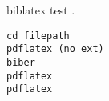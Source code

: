 \documentclass{article}
\begin{document}
biblatex test \parencite{something}.

\begin{verbatim}
cd filepath
pdflatex (no ext)
biber
pdflatex
pdflatex
\end{verbatim}

\printbibliography
\end{document}
